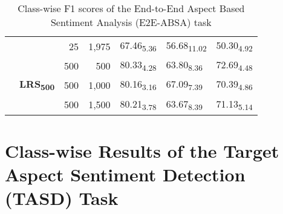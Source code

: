 \begin{table}[h]
{\begin{tabular}{llrrlll}
 &  & 25 & 1,975 & 67.46\textsubscript{5.36} &56.68\textsubscript{11.02} &50.30\textsubscript{4.92}  \\
\arrayrulecolor{gray}\cline{2-7}\arrayrulecolor{black}
 & \multirow{3}{*}{\textbf{LRS\textsubscript{500}}} & 500 & 500 & 80.33\textsubscript{4.28} &63.80\textsubscript{8.36} &72.69\textsubscript{4.48}  \\
 &  & 500 & 1,000 & 80.16\textsubscript{3.16} &67.09\textsubscript{7.39} &70.39\textsubscript{4.86}  \\
 &  & 500 & 1,500 & 80.21\textsubscript{3.78} &63.67\textsubscript{8.39} &71.13\textsubscript{5.14}  \\
\hline
\end{tabular}
}
\caption{Class-wise F1 scores of the End-to-End Aspect Based Sentiment Analysis (E2E-ABSA) task}
\end{table}


\section{Class-wise Results of the Target Aspect Sentiment Detection (TASD) Task}\label{appendix:tasd-performance}

